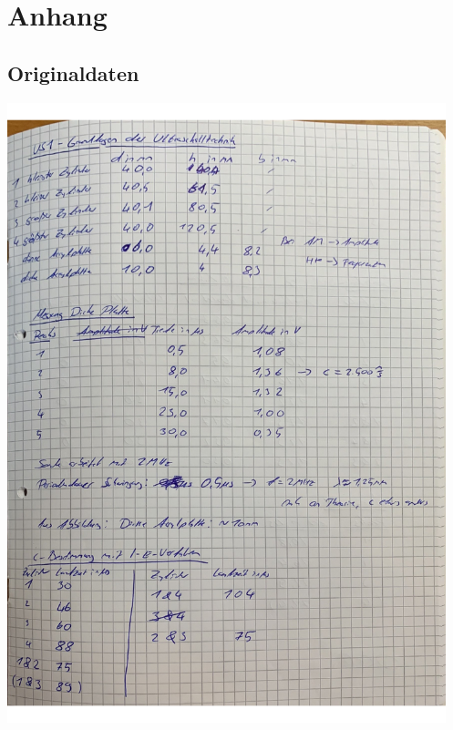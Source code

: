 \section{Anhang}
\label{sec:Anhang}
\subsection{Originaldaten}
\centering
\includegraphics[height=18cm]{content/Abbildungen/Originaldaten/Originaldaten_1.pdf}
\newpage
\centering
